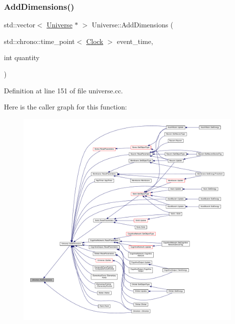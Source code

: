 \subsubsection{\texorpdfstring{Add\+Dimensions()}{AddDimensions()}}
{\footnotesize\ttfamily std\+::vector$<$ \hyperlink{class_universe}{Universe} $\ast$ $>$ Universe\+::\+Add\+Dimensions (\begin{DoxyParamCaption}\item[{std\+::chrono\+::time\+\_\+point$<$ \hyperlink{universe_8h_a0ef8d951d1ca5ab3cfaf7ab4c7a6fd80}{Clock} $>$}]{event\+\_\+time,  }\item[{int}]{quantity }\end{DoxyParamCaption})}



Definition at line 151 of file universe.\+cc.

Here is the caller graph for this function\+:
\nopagebreak
\begin{figure}[H]
\begin{center}
\leavevmode
\includegraphics[width=350pt]{class_universe_a03bdf5f7fea4209241e9bf5316d45517_icgraph}
\end{center}
\end{figure}
\mbox{\label{class_universe_a90c573dec55f2b3ad5680015356f5f25}} 
